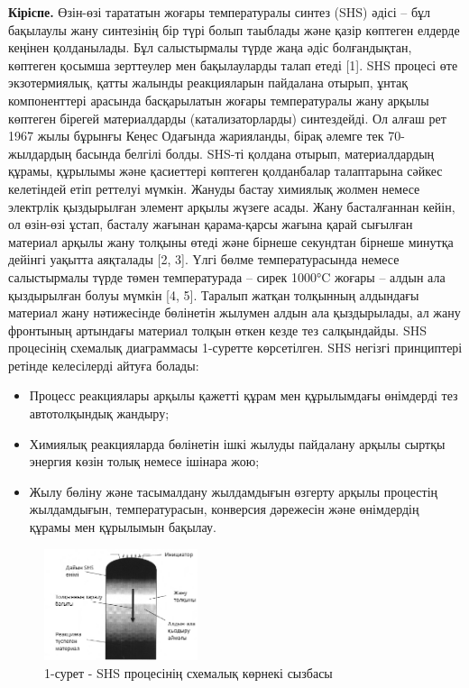 \begin{multicols}{2}
{\bfseries Кіріспе.} Өзін-өзі тарататын жоғары температуралы синтез (SHS)
әдісі -- бұл бақылаулы жану синтезінің бір түрі болып таыблады және
қазір көптеген елдерде кеңінен қолданылады. Бұл салыстырмалы түрде жаңа
әдіс болғандықтан, көптеген қосымша зерттеулер мен бақылауларды талап
етеді {[}1{]}. SHS процесі өте экзотермиялық, қатты жалынды реакцияларын
пайдалана отырып, ұнтақ компоненттері арасында басқарылатын жоғары
температуралы жану арқылы көптеген бірегей материалдарды
(катализаторларды) синтездейді. Ол алғаш рет 1967 жылы бұрынғы Кеңес
Одағында жарияланды, бірақ әлемге тек 70-жылдардың басында белгілі
болды. SHS-ті қолдана отырып, материалдардың құрамы, құрылымы және
қасиеттері көптеген қолданбалар талаптарына сәйкес келетіндей етіп
реттелуі мүмкін. Жануды бастау химиялық жолмен немесе электрлік
қыздырылған элемент арқылы жүзеге асады. Жану басталғаннан кейін, ол
өзін-өзі ұстап, басталу жағынан қарама-қарсы жағына қарай сығылған
материал арқылы жану толқыны өтеді және бірнеше секундтан бірнеше
минутқа дейінгі уақытта аяқталады {[}2, 3{]}. Үлгі бөлме
температурасында немесе салыстырмалы түрде төмен температурада -- сирек
1000°C жоғары -- алдын ала қыздырылған болуы мүмкін {[}4, 5{]}. Таралып
жатқан толқынның алдындағы материал жану нәтижесінде бөлінетін жылумен
алдын ала қыздырылады, ал жану фронтының артындағы материал толқын өткен
кезде тез салқындайды. SHS процесінің схемалық диаграммасы 1-суретте
көрсетілген. SHS негізгі принциптері ретінде келесілерді айтуға болады:

\begin{itemize}
\item
  Процесс реакциялары арқылы қажетті құрам мен құрылымдағы өнімдерді тез
  автотолқындық жандыру;
\item
  Химиялық реакцияларда бөлінетін ішкі жылуды пайдалану арқылы сыртқы
  энергия көзін толық немесе ішінара жою;
\item
  Жылу бөліну және тасымалдану жылдамдығын өзгерту арқылы процестің
  жылдамдығын, температурасын, конверсия дәрежесін және өнімдердің
  құрамы мен құрылымын бақылау.
\end{itemize}
\end{multicols}

\begin{figure}[H]
	\centering
	\includegraphics[width=0.4\textwidth]{assets/69}
	\caption*{1-сурет - SHS процесінің схемалық көрнекі сызбасы}
\end{figure}

